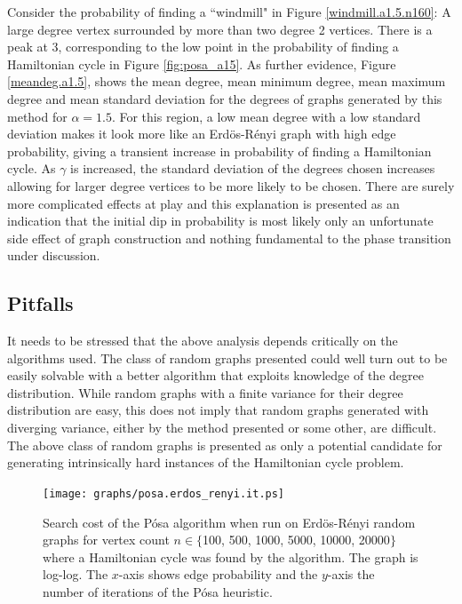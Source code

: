 \documentclass[twoside,11pt]{article}
\begin{document}
Consider the probability of finding a ``windmill" in Figure \ref{windmill.a1.5.n160}: A large degree vertex surrounded
by more than two degree 2 vertices.  There is a peak at 3, corresponding to the low point in the probability of finding
a Hamiltonian cycle in Figure \ref{fig:posa_a15}.  As further evidence,  Figure \ref{meandeg.a1.5},
shows the mean degree, mean minimum degree, mean maximum degree and
mean standard deviation for the degrees of graphs generated by this method for $\alpha=1.5$.  For this region, a
low mean degree with a low standard deviation makes it look more like an Erd\"os-R\'enyi graph with high edge probability,
giving a transient increase in probability of finding a Hamiltonian cycle.
As $\gamma$ is increased, the standard deviation of the degrees chosen increases allowing for larger degree vertices to
be more likely to be chosen.
There are surely more complicated effects at play and this explanation is
presented
as an indication that the initial dip in probability is most likely only an unfortunate side effect of graph construction and
nothing fundamental to the phase transition under discussion.



\subsection{Pitfalls}
\label{sec:Pitfalls}

It needs to be stressed that the above analysis depends critically on the algorithms used.  The class of random graphs
presented could well turn out to be easily solvable with a better algorithm that exploits knowledge of the degree distribution.
While random graphs with a finite variance for their degree distribution are easy, this does not imply that random graphs generated with diverging
variance, either by the method presented or some other, are difficult.  The above class of random graphs is presented as only a potential candidate
for generating intrinsically hard instances of the Hamiltonian cycle problem.

\begin{figure}
\centering
\texttt{[image: graphs/posa.erdos\_renyi.it.ps]}
\caption{Search cost  of the P\'osa algorithm when run on Erd\"os-R\'enyi random graphs for
vertex count $n \in \{$100, 500, 1000, 5000, 10000, 20000$\}$ where a Hamiltonian cycle was found by the algorithm.
The graph is log-log.  The $x$-axis shows edge probability and the $y$-axis the number of iterations of the  P\'osa heuristic. }
\label{fig:posa_erdos_renyi}
\end{figure}
\end{document}

